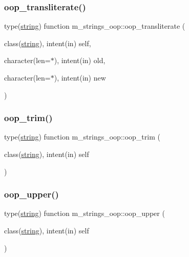 \subsubsection{\texorpdfstring{oop\+\_\+transliterate()}{oop\_transliterate()}}
{\footnotesize\ttfamily type(\mbox{\hyperlink{structm__strings__oop_1_1string}{string}}) function m\+\_\+strings\+\_\+oop\+::oop\+\_\+transliterate (\begin{DoxyParamCaption}\item[{class(\mbox{\hyperlink{structm__strings__oop_1_1string}{string}}), intent(in)}]{self,  }\item[{character(len=$\ast$), intent(in)}]{old,  }\item[{character(len=$\ast$), intent(in)}]{new }\end{DoxyParamCaption})\hspace{0.3cm}{\ttfamily [private]}}

\mbox{\label{namespacem__strings__oop_ab9238801d6c3af2fe7ee81c8d2c514ff}} 
\subsubsection{\texorpdfstring{oop\+\_\+trim()}{oop\_trim()}}
{\footnotesize\ttfamily type(\mbox{\hyperlink{structm__strings__oop_1_1string}{string}}) function m\+\_\+strings\+\_\+oop\+::oop\+\_\+trim (\begin{DoxyParamCaption}\item[{class(\mbox{\hyperlink{structm__strings__oop_1_1string}{string}}), intent(in)}]{self }\end{DoxyParamCaption})\hspace{0.3cm}{\ttfamily [private]}}

\mbox{\label{namespacem__strings__oop_a9f4030a1ab2c7e2aa71b9d1f2754e67e}} 
\subsubsection{\texorpdfstring{oop\+\_\+upper()}{oop\_upper()}}
{\footnotesize\ttfamily type(\mbox{\hyperlink{structm__strings__oop_1_1string}{string}}) function m\+\_\+strings\+\_\+oop\+::oop\+\_\+upper (\begin{DoxyParamCaption}\item[{class(\mbox{\hyperlink{structm__strings__oop_1_1string}{string}}), intent(in)}]{self }\end{DoxyParamCaption})\hspace{0.3cm}{\ttfamily [private]}}

